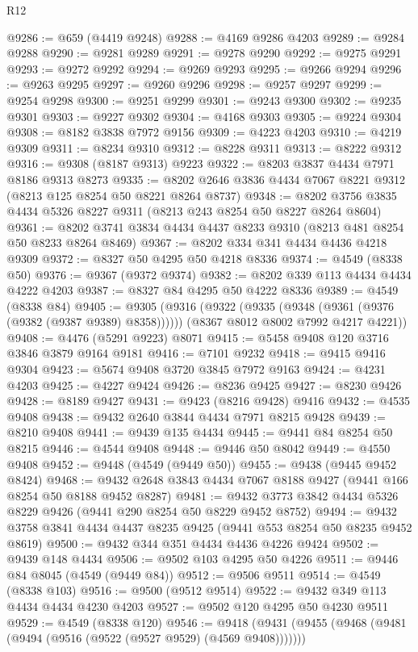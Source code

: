 \begin{lexlean}{R12}
\begin{coremodule}
@9286 := @659 (@4419 @9248)
@9288 := @4169 @9286 @4203
@9289 := @9284 @9288
@9290 := @9281 @9289
@9291 := @9278 @9290
@9292 := @9275 @9291
@9293 := @9272 @9292
@9294 := @9269 @9293
@9295 := @9266 @9294
@9296 := @9263 @9295
@9297 := @9260 @9296
@9298 := @9257 @9297
@9299 := @9254 @9298
@9300 := @9251 @9299
@9301 := @9243 @9300
@9302 := @9235 @9301
@9303 := @9227 @9302
@9304 := @4168 @9303
@9305 := @9224 @9304
@9308 := @8182 @3838 @7972 @9156
@9309 := @4223 @4203
@9310 := @4219 @9309
@9311 := @8234 @9310
@9312 := @8228 @9311
@9313 := @8222 @9312
@9316 := @9308 (@8187 @9313) @9223
@9322 := @8203 @3837 @4434 @7971 @8186 @9313 @8273
@9335 := @8202 @2646 @3836 @4434 @7067 @8221 @9312 (@8213 @125 @8254 @50 @8221 @8264 @8737)
@9348 := @8202 @3756 @3835 @4434 @5326 @8227 @9311 (@8213 @243 @8254 @50 @8227 @8264 @8604)
@9361 := @8202 @3741 @3834 @4434 @4437 @8233 @9310 (@8213 @481 @8254 @50 @8233 @8264 @8469)
@9367 := @8202 @334 @341 @4434 @4436 @4218 @9309
@9372 := @8327 @50 @4295 @50 @4218 @8336
@9374 := @4549 (@8338 @50)
@9376 := @9367 (@9372 @9374)
@9382 := @8202 @339 @113 @4434 @4434 @4222 @4203
@9387 := @8327 @84 @4295 @50 @4222 @8336
@9389 := @4549 (@8338 @84)
@9405 := @9305
    (@9316
      (@9322 (@9335 (@9348 (@9361 (@9376 (@9382 (@9387 @9389) @8358))))))
      (@8367 @8012 @8002 @7992 @4217 @4221))
@9408 := @4476 (@5291 @9223) @8071
@9415 := @5458 @9408 @120 @3716 @3846 @3879 @9164 @9181
@9416 := @7101 @9232
@9418 := @9415 @9416 @9304
@9423 := @5674 @9408 @3720 @3845 @7972 @9163
@9424 := @4231 @4203
@9425 := @4227 @9424
@9426 := @8236 @9425
@9427 := @8230 @9426
@9428 := @8189 @9427
@9431 := @9423 (@8216 @9428) @9416
@9432 := @4535 @9408
@9438 := @9432 @2640 @3844 @4434 @7971 @8215 @9428
@9439 := @8210 @9408
@9441 := @9439 @135 @4434
@9445 := @9441 @84 @8254 @50 @8215
@9446 := @4544 @9408
@9448 := @9446 @50 @8042
@9449 := @4550 @9408
@9452 := @9448 (@4549 (@9449 @50))
@9455 := @9438 (@9445 @9452 @8424)
@9468 := @9432 @2648 @3843 @4434 @7067 @8188 @9427 (@9441 @166 @8254 @50 @8188 @9452 @8287)
@9481 := @9432 @3773 @3842 @4434 @5326 @8229 @9426 (@9441 @290 @8254 @50 @8229 @9452 @8752)
@9494 := @9432 @3758 @3841 @4434 @4437 @8235 @9425 (@9441 @553 @8254 @50 @8235 @9452 @8619)
@9500 := @9432 @344 @351 @4434 @4436 @4226 @9424
@9502 := @9439 @148 @4434
@9506 := @9502 @103 @4295 @50 @4226
@9511 := @9446 @84 @8045 (@4549 (@9449 @84))
@9512 := @9506 @9511
@9514 := @4549 (@8338 @103)
@9516 := @9500 (@9512 @9514)
@9522 := @9432 @349 @113 @4434 @4434 @4230 @4203
@9527 := @9502 @120 @4295 @50 @4230 @9511
@9529 := @4549 (@8338 @120)
@9546 := @9418
    (@9431
      (@9455 (@9468 (@9481 (@9494 (@9516 (@9522 (@9527 @9529) (@4569 @9408)))))))

\end{coremodule}
\end{lexlean}
